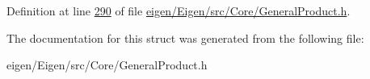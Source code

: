 Definition at line \hyperlink{eigen_2_eigen_2src_2_core_2_general_product_8h_source_l00290}{290} of file \hyperlink{eigen_2_eigen_2src_2_core_2_general_product_8h_source}{eigen/\+Eigen/src/\+Core/\+General\+Product.\+h}.



The documentation for this struct was generated from the following file\+:\begin{DoxyCompactItemize}
\item 
eigen/\+Eigen/src/\+Core/\+General\+Product.\+h\end{DoxyCompactItemize}
